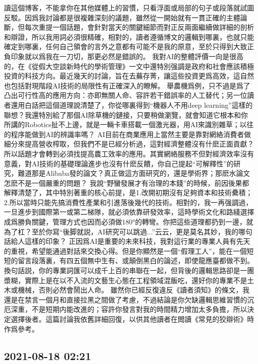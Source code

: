 \documentclass[twocolumn]{ctexart}
\begin{document}
讀這個博客，不能拿你在其他媒體上的習慣，只看浮面或局部的句子或段落就試圖反駁。因爲我討論都是很複雜深刻的議題，雖然從一開始就有一貫正確的主體論斷，但每次重提一個話題，會針對當天的關鍵細節而對正反兩面繼續做詳細的剖析和辯證，所以我用詞必須很精確，相對的，讀者遵循博文的邏輯到哪裏，也就只能確定到哪裏，任何自己領會的言外之意都有可能不是我的原意，至於只得到大致正負印象就以爲我在一刀切，那更必然是錯誤的。
我對AI的整體評價一向是很高的，在《從假大空談新時代的學術管理》一文中還特別强調是政府和社會應該積極投資的科技方向。最近幾天的討論，旨在去蕪存菁，讓這些投資更爲高效，這自然也包括對現階段AI技術的局限性有正確深入的瞭解。
舉農機爲例，只不過是爲了凸出可行性高的應用方向：亦即無關人命、容許若干錯誤率的人工替代；另一位讀者還用白話把這個道理說清楚了，你從哪裏得到“機器人不用deep learning”這樣的聯想？我還特別給了那個AI除草機的鏈接，只要稍做瀏覽，就會知道它根本和你所講的Robotics扯不上邊，就是一輛卡車搭載一個激光器，用AI來識別雜草；以往的程序能做到AI的辨識率嗎？
AI目前在商業應用上當然主要是靠對網絡消費者做細分來提高營收榨取，但我們不是已經分析過，這對經濟整體沒有什麽正面貢獻？所以話題才會轉到必須找提高農工效率的應用。其實網絡服務不但對經濟效率沒有意義，對AI技術的基礎理論進步也沒有什麽反饋，你自己提起“可解釋性”的研究，難道那是Alibaba發的論文？真正做這方面研究的，還是學術界；那麽水論文怎麽不是一個嚴重的問題？
我說“野蠻發展才有治理的本錢”的時候，前因後果都解釋清楚了，其中特別著重的核心前提，是1.改開初期沒有足夠資本和技術纍積；2.所以當時只能先搞消費性產業和引進落後幾代的技術。相對的，我一再强調過，一旦進步到國際第一或第二梯隊，就必須依靠研發效率，這時學術文化和路綫選擇成爲勝負關鍵，管理方式也因而必須做180°的轉彎。你把這些道理都扔到一邊，就為了杠？至於你寫“後脚就説，AI研究可以跳過...”云云，更是莫名其妙，我的哪句話給人這樣的印象？
正因爲AI是重要的未來科技，我對這行業的專業人員有先天的重視，希望能通過對話來交換心得。但是你顯然是一個“假理工人”，能在一個短短的留言段落裏，有四五個無中生有、或顛倒黑白的論述，即使龍應臺都做不到。換句話説，你的專業詞匯可以成千上百的串聯在一起，但背後的邏輯思路卻是一團漿糊，實際上是在以不入流的文藝生心態在工程領域混飯吃，還好你的專業不是土木或機械，否則必然會鬧出人命。
雖然你已經反復違反《讀者須知》的條文，我還是在禁言一個月和直接拉黑之間做了考慮，不過結論是你欠缺邏輯思維習慣的沉厄深重，不是短期内能改進的；容許你發言對我的時間精力增加太多負擔，所以決定選擇後者。這篇討論我依舊詳細回復，以供其他讀者在閲讀《常見的狡辯術》時作爲參考。
\subsection*{2021-08-18 02:21}
\end{document}

